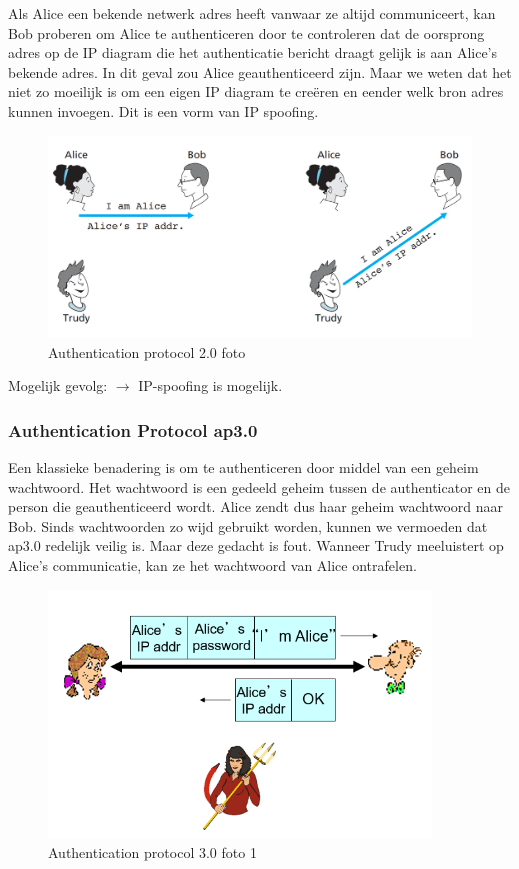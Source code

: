 \noindent Als Alice een bekende netwerk adres heeft vanwaar ze altijd communiceert, kan Bob proberen om Alice te authenticeren door te controleren dat de oorsprong adres op de IP diagram die het authenticatie bericht draagt gelijk is aan Alice’s bekende adres. In dit geval zou Alice geauthenticeerd zijn.
Maar we weten dat het niet zo moeilijk is om een eigen IP diagram te creëren en eender welk bron adres kunnen invoegen. Dit is een vorm van IP spoofing.
\begin{figure}[h]
    \centering
    \includegraphics[width=7in]{./img/imghfdst8/Figure8-15.PNG}
    \caption{Authentication protocol 2.0 foto  }     
    \label{fig:Authentication protocol 2.0 foto 1}
\end{figure}

\noindent Mogelijk gevolg: $\rightarrow$ IP-spoofing is mogelijk.

\newpage

\subsubsection{Authentication Protocol ap3.0}

\noindent Een klassieke benadering is om te authenticeren door middel van een geheim wachtwoord. Het wachtwoord is een gedeeld geheim tussen de authenticator en de person die geauthenticeerd wordt.
Alice zendt dus haar geheim wachtwoord naar Bob. Sinds wachtwoorden zo wijd gebruikt worden, kunnen we vermoeden dat ap3.0 redelijk veilig is.
Maar deze gedacht is fout. Wanneer Trudy meeluistert op Alice’s communicatie, kan ze het wachtwoord van Alice ontrafelen.
\begin{figure}[h]
    \centering
    \includegraphics[width=4in]{./img/imghfdst8/hfdst8puntje16.png}
    \caption{Authentication protocol 3.0 foto 1}      
    \label{fig:Authentication protocol 3.0 foto 1}
\end{figure}

